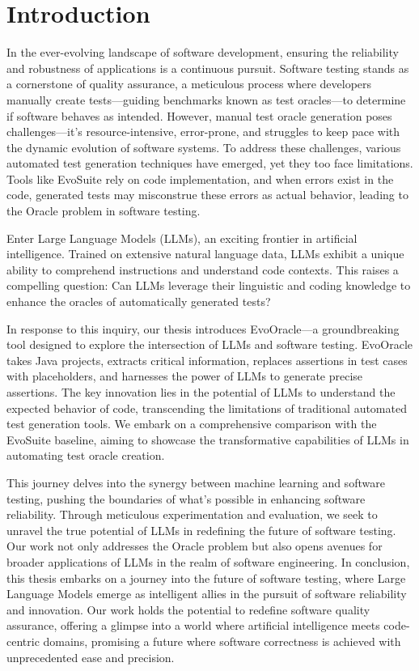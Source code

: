 \chapter{Introduction}
\label{cha:introduction}
\vspace{0.4 cm}

In the ever-evolving landscape of software development, ensuring the reliability and robustness of applications is a continuous pursuit. Software testing stands as a cornerstone of quality assurance, a meticulous process where developers manually create tests—guiding benchmarks known as test oracles—to determine if software behaves as intended. However, manual test oracle generation poses challenges—it's resource-intensive, error-prone, and struggles to keep pace with the dynamic evolution of software systems. To address these challenges, various automated test generation techniques have emerged, yet they too face limitations. Tools like EvoSuite rely on code implementation, and when errors exist in the code, generated tests may misconstrue these errors as actual behavior, leading to the Oracle problem in software testing.

Enter Large Language Models (LLMs), an exciting frontier in artificial intelligence. Trained on extensive natural language data, LLMs exhibit a unique ability to comprehend instructions and understand code contexts. This raises a compelling question: Can LLMs leverage their linguistic and coding knowledge to enhance the oracles of automatically generated tests?

In response to this inquiry, our thesis introduces EvoOracle—a groundbreaking tool designed to explore the intersection of LLMs and software testing. EvoOracle takes Java projects, extracts critical information, replaces assertions in test cases with placeholders, and harnesses the power of LLMs to generate precise assertions. The key innovation lies in the potential of LLMs to understand the expected behavior of code, transcending the limitations of traditional automated test generation tools. We embark on a comprehensive comparison with the EvoSuite baseline, aiming to showcase the transformative capabilities of LLMs in automating test oracle creation.

This journey delves into the synergy between machine learning and software testing, pushing the boundaries of what's possible in enhancing software reliability. Through meticulous experimentation and evaluation, we seek to unravel the true potential of LLMs in redefining the future of software testing. Our work not only addresses the Oracle problem but also opens avenues for broader applications of LLMs in the realm of software engineering. In conclusion, this thesis embarks on a journey into the future of software testing, where Large Language Models emerge as intelligent allies in the pursuit of software reliability and innovation. Our work holds the potential to redefine software quality assurance, offering a glimpse into a world where artificial intelligence meets code-centric domains, promising a future where software correctness is achieved with unprecedented ease and precision. 


